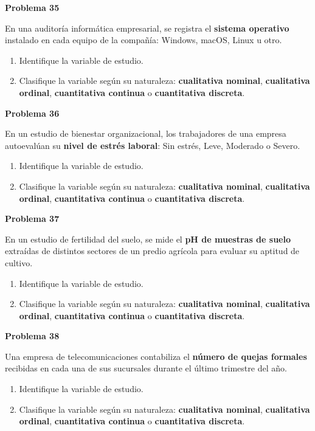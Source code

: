 \documentclass[10pt,letterpaper]{article}
\newcommand{\problema}[1]{%
  \vspace{2pt}%
  \begin{tcolorbox}[
    enhanced,
    colback=white,
    colframe=black,
    arc=0pt,
    boxrule=0pt,
    leftrule=2pt,
    left=6pt, right=6pt,
    top=1pt, bottom=1pt,
  ]
    {\normalsize\bfseries\sffamily #1}
  \end{tcolorbox}%
  \vspace{1pt}%
}
\begin{document}
\problema{Problema 35}
\noindent\sffamily\small En una auditor\'ia inform\'atica empresarial, se registra el \textbf{sistema operativo} instalado en cada equipo de la compa\~n\'ia: Windows, macOS, Linux u otro.
\begin{enumerate}[leftmargin=1.2cm, label=\textbf{\alph*)}, itemsep=0pt, topsep=2pt]
  \item Identifique la variable de estudio.
  \item Clasifique la variable seg\'un su naturaleza: \textbf{cualitativa nominal}, \textbf{cualitativa ordinal}, \textbf{cuantitativa continua} o \textbf{cuantitativa discreta}.
\end{enumerate}

\problema{Problema 36}
\noindent\sffamily\small En un estudio de bienestar organizacional, los trabajadores de una empresa autoevalúan su \textbf{nivel de estr\'es laboral}: Sin estr\'es, Leve, Moderado o Severo.
\begin{enumerate}[leftmargin=1.2cm, label=\textbf{\alph*)}, itemsep=0pt, topsep=2pt]
  \item Identifique la variable de estudio.
  \item Clasifique la variable seg\'un su naturaleza: \textbf{cualitativa nominal}, \textbf{cualitativa ordinal}, \textbf{cuantitativa continua} o \textbf{cuantitativa discreta}.
\end{enumerate}

\problema{Problema 37}
\noindent\sffamily\small En un estudio de fertilidad del suelo, se mide el \textbf{pH de muestras de suelo} extra\'idas de distintos sectores de un predio agr\'icola para evaluar su aptitud de cultivo.
\begin{enumerate}[leftmargin=1.2cm, label=\textbf{\alph*)}, itemsep=0pt, topsep=2pt]
  \item Identifique la variable de estudio.
  \item Clasifique la variable seg\'un su naturaleza: \textbf{cualitativa nominal}, \textbf{cualitativa ordinal}, \textbf{cuantitativa continua} o \textbf{cuantitativa discreta}.
\end{enumerate}

\problema{Problema 38}
\noindent\sffamily\small Una empresa de telecomunicaciones contabiliza el \textbf{n\'umero de quejas formales} recibidas en cada una de sus sucursales durante el \'ultimo trimestre del a\~no.
\begin{enumerate}[leftmargin=1.2cm, label=\textbf{\alph*)}, itemsep=0pt, topsep=2pt]
  \item Identifique la variable de estudio.
  \item Clasifique la variable seg\'un su naturaleza: \textbf{cualitativa nominal}, \textbf{cualitativa ordinal}, \textbf{cuantitativa continua} o \textbf{cuantitativa discreta}.
\end{enumerate}
\end{document}
